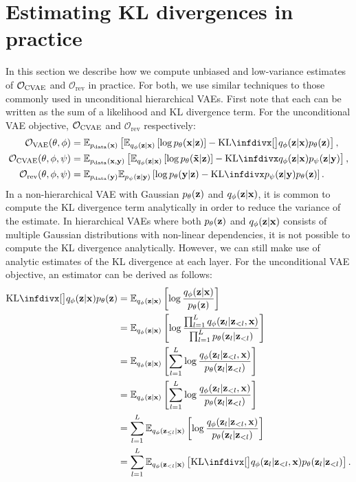 \section{Estimating KL divergences in practice} \label{supp:cigcvae-kl-estimates}
In this section we describe how we compute unbiased and low-variance estimates
of ${\mathcal{O}}_\text{CVAE}$ and $\mathcal{O}_\text{rev}$ in practice. For
both, we use similar techniques to those commonly used in unconditional
hierarchical VAEs. First note that each can be written as the sum of a
likelihood and KL divergence term. For the unconditional VAE objective,
${\mathcal{O}}_\text{CVAE}$ and $\mathcal{O}_\text{rev}$ respectively:
\begin{align}
  \gO_\text{VAE}(\theta, \phi)
  &= \EX_{\pdata (\rvx)}\left[ \EX_{q_\phi(\rvz|\rvx)} \left[ \log p_\theta(\rvx|\rvz)  \right] - \kl[\big]{q_\phi(\rvz|\rvx)}{p_\theta(\rvz)}  \right], \\
  \gO_\text{CVAE}(\theta, \phi, \psi ) &= \EX_{\pdata (\rvx, \rvy)} \left[ \EX_{q_\phi(\rvz|\rvx)} \left[ \log p_\theta(\tildeI{}|\rvz) \right] - \kl{q_\phi(\rvz|\rvx)}{p_\psi(\rvz|\rvy)} \right], \\
  \mathcal{O}_\text{rev}(\theta, \phi, \psi ) &= \EX_{\pdata (\rvy)}\EX_{p_\psi(\rvz|\rvy)} \left[ \log p_\theta(\rvy|\rvz) - \kl{p_\psi(\rvz|\rvy)}{p_\theta(\rvz)} \right].
\end{align}
In a non-hierarchical VAE with Gaussian $p_\theta({\mathbf{z}})$ and $q_\phi({\mathbf{z}}|{\mathbf{x}})$, it is
common to compute the KL divergence term analytically in order to reduce the
variance of the estimate. In hierarchical VAEs where both $p_\theta({\mathbf{z}})$ and
$q_\phi({\mathbf{z}}|{\mathbf{x}})$ consists of multiple Gaussian distributions with non-linear
dependencies, it is not possible to compute the KL divergence analytically.
However, we can still make use of analytic estimates of the KL divergence at
each layer. For the unconditional VAE objective, an estimator can be derived as
follows:
\begin{align}
  \kl[\big]{q_\phi(\rvz|\rvx)}{p_\theta(\rvz)} &= \EX_{q_\phi(\rvz|\rvx)} \left[ \log \frac{q_\phi(\rvz|\rvx)}{p_\theta(\rvz)} \right] \\
                                     &= \EX_{q_\phi(\rvz|\rvx)} \left[ \log \frac{\prod_{l=1}^L q_\phi(\rvz_l|\rvz_{<l}, \rvx)}{\prod_{l=1}^L p_\theta(\rvz_l|\rvz_{<l})} \right] \\
                                     &= \EX_{q_\phi(\rvz|\rvx)} \left[ \sum_{l=1}^L \log \frac{q_\phi(\rvz_l|\rvz_{<l}, \rvx)}{p_\theta(\rvz_l|\rvz_{<l})} \right] \\
                                     &= \EX_{q_\phi(\rvz|\rvx)} \left[ \sum_{l=1}^L \log \frac{q_\phi(\rvz_l|\rvz_{<l}, \rvx)}{p_\theta(\rvz_l|\rvz_{<l})} \right] \\
                                     &= \sum_{l=1}^L \EX_{q_\phi(\rvz_{\leq l}|\rvx)} \left[ \log \frac{q_\phi(\rvz_l|\rvz_{<l}, \rvx)}{p_\theta(\rvz_l|\rvz_{<l})} \right] \\
                                     &= \sum_{l=1}^L \EX_{q_\phi(\rvz_{<l}|\rvx)} \left[ \kl[\big]{q_\phi(\rvz_l|\rvz_{<l}, \rvx)}{p_\theta(\rvz_l|\rvz_{<l})} \right].
\end{align}

